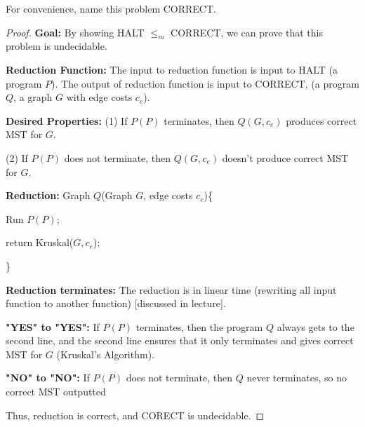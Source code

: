 \documentclass[openany]{article}
\begin{document}
For convenience, name this problem CORRECT.

\begin{proof}
    \textbf{Goal:} By showing HALT $\leqslant_m$ CORRECT, we can prove that this problem is undecidable. 

\textbf{Reduction Function:} The input to reduction function is input to HALT (a program $P$). The output of reduction function is input to CORRECT, (a program $Q$, a graph $G$ with edge costs $c_e$). 

\textbf{Desired Properties:}
(1) If $P(P)$ terminates, then $Q(G, c_e)$ produces correct MST for $G$.

(2) If $P(P)$ does not terminate, then $Q(G, c_e)$ doesn't produce correct MST for $G$.

\textbf{Reduction:}
Graph $Q$(Graph $G$, edge costs $c_e$)\{

\qquad Run $P(P)$;

\qquad return Kruskal($G, c_e$);

\}

\textbf{Reduction terminates:}
The reduction is in linear time (rewriting all input function to another function) [discussed in lecture].

\textbf{"YES" to "YES":} If $P(P)$ terminates, then the program $Q$ always gets to the
second line, and the second line ensures that it only
terminates and gives correct MST for $G$ (Kruskal's Algorithm).

\textbf{"NO" to "NO":} If $P(P)$ does not terminate, then $Q$ never terminates, so no correct MST outputted

Thus, reduction is correct, and CORECT is undecidable.


\end{proof}
\end{document}
